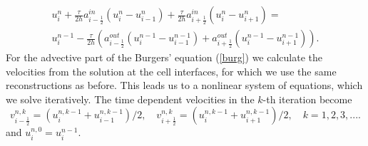 \documentclass[a4paper,12pt,twoside]{report}%
\newcounter{eqn}
\begin{document}
\begin{eqnarray}
	\label{iioe0}
	u^n_i + \frac{\tau}{2h} a^{in}_{i-\frac{1}{2}}  \left(u^n_i - u^n_{i-1}\right) + 
	\frac{\tau}{2h} a^{in}_{i+\frac{1}{2}} \left(u^n_i - u^n_{i+1}\right) = \\
	u^{n-1}_i - \frac{\tau}{2h} \left(a^{out}_{i-\frac{1}{2}} \left(u^{n-1}_i - u^{n-1}_{i-1}\right) + 
	a^{out}_{i+\frac{1}{2}} \left(u^{n-1}_i - u^{n-1}_{i+1}\right)\right).\nonumber
\end{eqnarray}
For the advective part of the Burgers' equation (\ref{burg}) we calculate the velocities from the solution at the cell interfaces, for which we use the same reconstructions as before. This leads us to a nonlinear system of equations, which we solve iteratively. The time dependent velocities in the $ k $-th iteration become
\[ v^{n,k}_{i-\frac{1}{2}} = (u^{n,k-1}_i + u^{n,k-1}_{i-1})\slash 2,\quad
v^{n,k}_{i+\frac{1}{2}} = (u^{n,k-1}_i + u^{n,k-1}_{i+1})\slash 2,\quad k=1,2,3,.... \]
and $ u^{n,0}_i = u^{n-1}_i $.
\end{document}

